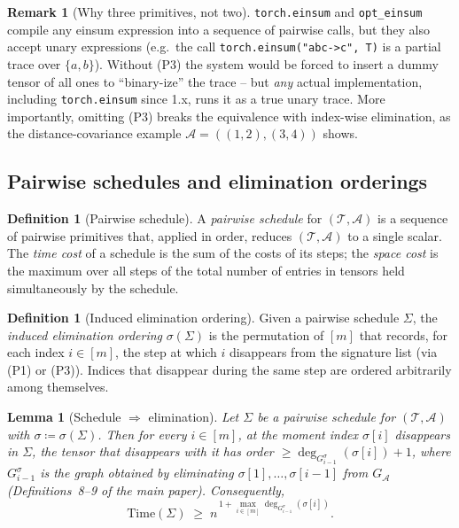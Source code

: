 \documentclass[11pt]{article}
\newcommand{\calA}{\mathcal{A}}
\newcommand{\calT}{\mathcal{T}}
\newcommand{\opteinsum}{\texttt{opt\_einsum}}
\newcommand{\torcheinsum}{\texttt{torch.einsum}}
\theoremstyle{plain}
\newtheorem{lemma}[theorem]{Lemma}
\theoremstyle{definition}
\newtheorem{definition}[theorem]{Definition}
\newtheorem{remark}[theorem]{Remark}
\begin{document}
\begin{remark}[Why three primitives, not two]
\torcheinsum{} and \opteinsum{} compile any einsum expression into a sequence
of pairwise calls, but they also accept unary expressions (e.g.\ the call
\texttt{torch.einsum("abc->c", T)} is a partial trace over $\{a,b\}$).
Without (P3) the system would be forced to insert a dummy tensor of all
ones to ``binary-ize'' the trace -- but \emph{any} actual implementation,
including \torcheinsum{} since 1.x, runs it as a true unary trace.  More
importantly, omitting (P3) breaks the equivalence with index-wise
elimination, as the distance-covariance example
$\calA=((1,2),(3,4))$ shows.
\end{remark}

\subsection{Pairwise schedules and elimination orderings}

\begin{definition}[Pairwise schedule]
\label{def:schedule}
A \emph{pairwise schedule} for $(\calT,\calA)$ is a sequence of pairwise
primitives that, applied in order, reduces $(\calT,\calA)$ to a single
scalar.  The \emph{time cost} of a schedule is the sum of the costs of its
steps; the \emph{space cost} is the maximum over all steps of the total
number of entries in tensors held simultaneously by the schedule.
\end{definition}

\begin{definition}[Induced elimination ordering]
\label{def:induced-elim}
Given a pairwise schedule $\Sigma$, the \emph{induced elimination ordering}
$\sigma(\Sigma)$ is the permutation of $[m]$ that records, for each index
$i\in[m]$, the step at which $i$ disappears from the signature list (via
(P1) or (P3)).  Indices that disappear during the same step are ordered
arbitrarily among themselves.
\end{definition}

\begin{lemma}[Schedule $\Rightarrow$ elimination]
\label{lem:schedule-to-elim}
Let $\Sigma$ be a pairwise schedule for $(\calT,\calA)$ with $\sigma\coloneqq
\sigma(\Sigma)$.  Then for every $i\in[m]$, at the moment index $\sigma[i]$
disappears in $\Sigma$, the tensor that disappears with it has order
$\geq \deg_{G^\sigma_{i-1}}(\sigma[i])+1$, where $G^\sigma_{i-1}$ is the
graph obtained by eliminating $\sigma[1],\ldots,\sigma[i-1]$ from $G_\calA$
(Definitions~8--9 of the main paper).  Consequently,
\[
   \mathrm{Time}(\Sigma) \;\geq\; n^{\,1+\max_{i\in[m]} \deg_{G^\sigma_{i-1}}(\sigma[i])}.
\]
\end{lemma}
\end{document}
